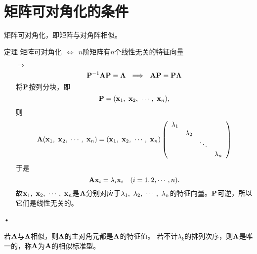 \section{矩阵可对角化的条件}
\begin{frame}
  \begin{footnotesize}
    矩阵可对角化，即矩阵与对角阵相似。    
  \end{footnotesize}
\end{frame}

\begin{frame}
  \begin{footnotesize}
    \begin{block}{定理}
      $\mbox{矩阵可对角化} ~~\Longleftrightarrow~~
      \mbox{$n$阶矩阵有$n$个线性无关的特征向量}$ 
    \end{block}
    \pause\proofname
    \begin{itemize}
\item[$\Rightarrow$] 
$$
\mathbf{P}^{-1}\mathbf{A}\mathbf{P}=\mathbf{\Lambda}  ~~\Longrightarrow~~
\mathbf{A}\mathbf{P}=\mathbf{P}\mathbf{\Lambda}
$$\pause
将$\mathbf{P}$按列分块，即
$$
\mathbf{P}=(\mathbf{x}_1,~\mathbf{x}_2,~\cdots,~\mathbf{x}_n),
$$
则
$$
\mathbf{A}(\mathbf{x}_1,~\mathbf{x}_2,~\cdots,~\mathbf{x}_n)=(\mathbf{x}_1,~\mathbf{x}_2,~\cdots,~\mathbf{x}_n)\left(
\begin{array}{cccc}
\lambda_1&&&\\
&\lambda_2&&\\
&&\ddots&\\
&&&\lambda_n
\end{array}
\right)
$$\pause
于是
$$
\mathbf{A}\mathbf{x}_i=\lambda_i\mathbf{x}_i\quad(i=1,2,\cdots,n).
$$\pause
故$\mathbf{x}_1,~\mathbf{x}_2,~\cdots,~\mathbf{x}_n$是$\mathbf{A}$分别对应于$\lambda_1,~\lambda_2,~\cdots,~\lambda_n$的特征向量。$\mathbf{P}$可逆，所以它们是线性无关的。
\end{itemize}•
  \end{footnotesize}
\end{frame}


\begin{frame}
  \begin{footnotesize}
    若$\mathbf{A}$与$\mathbf{\Lambda}$相似，则$\mathbf{\Lambda}$的主对角元都是$\mathbf{A}$的特征值。
    若不计$\lambda_k$的排列次序，则$\mathbf{\Lambda}$是唯一的，称$\mathbf{\Lambda}$为$\mathbf{A}$的相似标准型。
  \end{footnotesize}
\end{frame}


